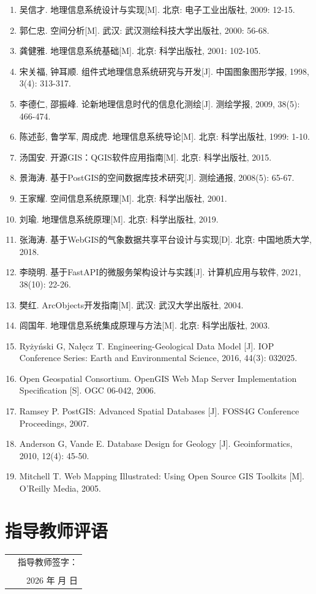 \documentclass[a4paper,12pt]{ctexart}
\begin{document}
\begin{enumerate}
    \item 吴信才. 地理信息系统设计与实现[M]. 北京: 电子工业出版社, 2009: 12-15.
    \item 郭仁忠. 空间分析[M]. 武汉: 武汉测绘科技大学出版社, 2000: 56-68.
    \item 龚健雅. 地理信息系统基础[M]. 北京: 科学出版社, 2001: 102-105.
    \item 宋关福, 钟耳顺. 组件式地理信息系统研究与开发[J]. 中国图象图形学报, 1998, 3(4): 313-317.
    \item 李德仁, 邵振峰. 论新地理信息时代的信息化测绘[J]. 测绘学报, 2009, 38(5): 466-474.
    \item 陈述彭, 鲁学军, 周成虎. 地理信息系统导论[M]. 北京: 科学出版社, 1999: 1-10.
    \item 汤国安. 开源GIS：QGIS软件应用指南[M]. 北京: 科学出版社, 2015.
    \item 景海涛. 基于PostGIS的空间数据库技术研究[J]. 测绘通报, 2008(5): 65-67.
    \item 王家耀. 空间信息系统原理[M]. 北京: 科学出版社, 2001.
    \item 刘瑜. 地理信息系统原理[M]. 北京: 科学出版社, 2019.
    \item 张海涛. 基于WebGIS的气象数据共享平台设计与实现[D]. 北京: 中国地质大学, 2018.
    \item 李晓明. 基于FastAPI的微服务架构设计与实践[J]. 计算机应用与软件, 2021, 38(10): 22-26.
    \item 樊红. ArcObjects开发指南[M]. 武汉: 武汉大学出版社, 2004.
    \item 闾国年. 地理信息系统集成原理与方法[M]. 北京: 科学出版社, 2003.
    \item Ryżyński G, Nałęcz T. Engineering-Geological Data Model [J]. IOP Conference Series: Earth and Environmental Science, 2016, 44(3): 032025.
    \item Open Geospatial Consortium. OpenGIS Web Map Server Implementation Specification [S]. OGC 06-042, 2006.
    \item Ramsey P. PostGIS: Advanced Spatial Databases [J]. FOSS4G Conference Proceedings, 2007.
    \item Anderson G, Vande E. Database Design for Geology [J]. Geoinformatics, 2010, 12(4): 45-50.
    \item Mitchell T. Web Mapping Illustrated: Using Open Source GIS Toolkits [M]. O'Reilly Media, 2005.
\end{enumerate}

\newpage
\thispagestyle{empty}
\section*{指导教师评语}

\vspace{8cm}

\noindent
\begin{tabular}{p{8cm}r}
    & 指导教师签字：\underline{\hspace{4cm}} \\
    & \\
    & 2026 年 \hspace{1cm} 月 \hspace{1cm} 日 \\
\end{tabular}
\end{document}
